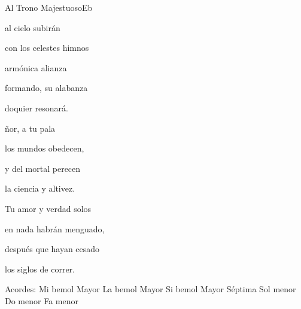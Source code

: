 \documentclass[12pt, spanish]{book}
\begin{document}
\begin{song}{Al Trono Majestuoso}{Eb}
\begin{SBOpGroup}
            al cielo subirán

            con los celestes himnos

            armónica alianza

            formando, su alabanza

            doquier resonará.
        \end{SBOpGroup}
        \vskip 20pt
        \begin{SBOpGroup}
            ñor, a tu pala

            los mundos obedecen,

            y del mortal perecen

            la ciencia y altivez.

            Tu amor y verdad solos

            en nada habrán menguado,

            después que hayan cesado

            los siglos de correr.
        \end{SBOpGroup}

        \ifChordBk
        \begin{SBOpGroup}
            Acordes:\break
            \upchord{\Eflat}\qquad Mi bemol Mayor \hfill
            \upchord{\Aflat}\qquad La bemol Mayor \hfill\null\break
            \upchord{\Bflatseven}\quad Si bemol Mayor S\'eptima \hfill
            \upchord{\Gm}Sol menor \hfill\null\break
            \upchord{\Cm}Do menor \hfill
            \upchord{\Fm}\quad Fa menor \hfill\null\break
        \end{SBOpGroup}
        \fi
    \end{song}
\end{document}
